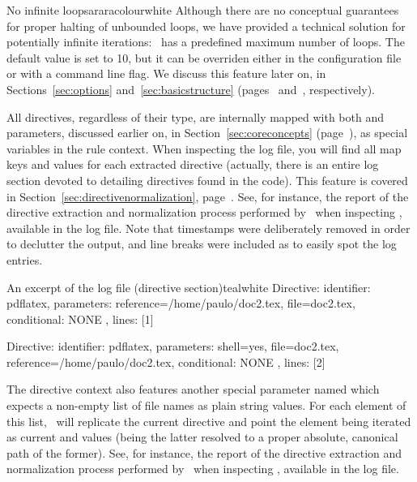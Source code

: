 \begin{messagebox}{No infinite loops}{araracolour}{\icinfo}{white}
Although there are no conceptual guarantees for proper halting of unbounded loops, we have provided a technical solution for potentially infinite iterations: \arara\ has a predefined maximum number of loops. The default value is set to 10, but it can be overriden either in the configuration file or with a command line flag. We discuss this feature later on, in Sections~\ref{sec:options} and~\ref{sec:basicstructure} (pages~\pageref{sec:options} and~\pageref{sec:basicstructure}, respectively).
\end{messagebox}

All directives, regardless of their type, are internally mapped with both  and  parameters, discussed earlier on, in Section~\ref{sec:coreconcepts} (page~\pageref{sec:coreconcepts}), as special variables in the rule context. When inspecting the log file, you will find all map keys and values for each extracted directive (actually, there is an entire log section devoted to detailing directives found in the code). This feature is covered in Section~\ref{sec:directivenormalization}, page~\pageref{sec:directivenormalization}. See, for instance, the report of the directive extraction and normalization process performed by \arara\ when inspecting , available in the log file. Note that timestamps were deliberately removed in order to declutter the output, and line breaks were included as to easily spot the log entries.


\begin{codebox}{An excerpt of the log file (directive section)}{teal}{\icnote}{white}
Directive: { identifier: pdflatex, parameters:
{reference=/home/paulo/doc2.tex, file=doc2.tex},
conditional: { NONE }, lines: [1] }

Directive: { identifier: pdflatex, parameters:
{shell=yes, file=doc2.tex, reference=/home/paulo/doc2.tex},
conditional: { NONE }, lines: [2] }
\end{codebox}

The directive context also features another special parameter named  which expects a non-empty list of file names as plain string values. For each element of this list, \arara\ will replicate the current directive and point the element being iterated as current  and  values (being the latter resolved to a proper absolute, canonical path of the former). See, for instance, the report of the directive extraction and normalization process performed by \arara\ when inspecting , available in the log file.

